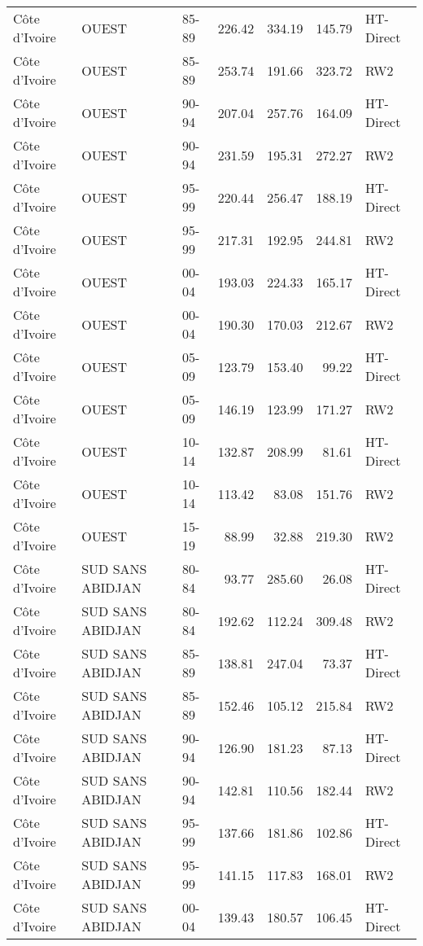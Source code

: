 \begin{longtable}{lllrrrl}
  C\^{o}te d'Ivoire & OUEST & 85-89 & 226.42 & 334.19 & 145.79 & HT-Direct \\ 
  C\^{o}te d'Ivoire & OUEST & 85-89 & 253.74 & 191.66 & 323.72 & RW2 \\ 
  C\^{o}te d'Ivoire & OUEST & 90-94 & 207.04 & 257.76 & 164.09 & HT-Direct \\ 
  C\^{o}te d'Ivoire & OUEST & 90-94 & 231.59 & 195.31 & 272.27 & RW2 \\ 
  C\^{o}te d'Ivoire & OUEST & 95-99 & 220.44 & 256.47 & 188.19 & HT-Direct \\ 
  C\^{o}te d'Ivoire & OUEST & 95-99 & 217.31 & 192.95 & 244.81 & RW2 \\ 
  C\^{o}te d'Ivoire & OUEST & 00-04 & 193.03 & 224.33 & 165.17 & HT-Direct \\ 
  C\^{o}te d'Ivoire & OUEST & 00-04 & 190.30 & 170.03 & 212.67 & RW2 \\ 
  C\^{o}te d'Ivoire & OUEST & 05-09 & 123.79 & 153.40 & 99.22 & HT-Direct \\ 
  C\^{o}te d'Ivoire & OUEST & 05-09 & 146.19 & 123.99 & 171.27 & RW2 \\ 
  C\^{o}te d'Ivoire & OUEST & 10-14 & 132.87 & 208.99 & 81.61 & HT-Direct \\ 
  C\^{o}te d'Ivoire & OUEST & 10-14 & 113.42 & 83.08 & 151.76 & RW2 \\ 
  C\^{o}te d'Ivoire & OUEST & 15-19 & 88.99 & 32.88 & 219.30 & RW2 \\ 
  C\^{o}te d'Ivoire & SUD SANS ABIDJAN & 80-84 & 93.77 & 285.60 & 26.08 & HT-Direct \\ 
  C\^{o}te d'Ivoire & SUD SANS ABIDJAN & 80-84 & 192.62 & 112.24 & 309.48 & RW2 \\ 
  C\^{o}te d'Ivoire & SUD SANS ABIDJAN & 85-89 & 138.81 & 247.04 & 73.37 & HT-Direct \\ 
  C\^{o}te d'Ivoire & SUD SANS ABIDJAN & 85-89 & 152.46 & 105.12 & 215.84 & RW2 \\ 
  C\^{o}te d'Ivoire & SUD SANS ABIDJAN & 90-94 & 126.90 & 181.23 & 87.13 & HT-Direct \\ 
  C\^{o}te d'Ivoire & SUD SANS ABIDJAN & 90-94 & 142.81 & 110.56 & 182.44 & RW2 \\ 
  C\^{o}te d'Ivoire & SUD SANS ABIDJAN & 95-99 & 137.66 & 181.86 & 102.86 & HT-Direct \\ 
  C\^{o}te d'Ivoire & SUD SANS ABIDJAN & 95-99 & 141.15 & 117.83 & 168.01 & RW2 \\ 
  C\^{o}te d'Ivoire & SUD SANS ABIDJAN & 00-04 & 139.43 & 180.57 & 106.45 & HT-Direct \\ 

\end{longtable}
